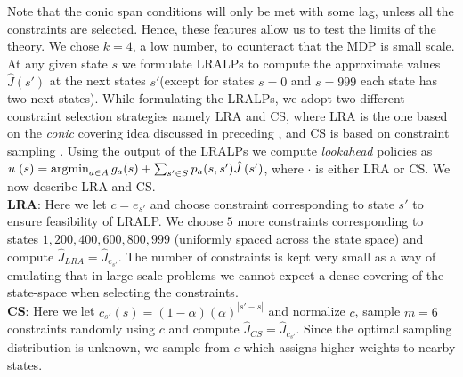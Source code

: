 \documentclass[twocolumn]{IEEEtran}
\begin{document}
Note that the conic span conditions will only be met with some lag, unless all the constraints are selected.
Hence, these features allow us to test the limits of the theory. 
We chose $k=4$, a low number, to counteract  that the MDP is small scale. 
At any given state $s$ we formulate LRALPs to compute the approximate values $\hat{J}(s')$ at the next states $s'$(except for states $s=0$ and $s=999$ each state has two next states). While formulating the LRALPs, we adopt two different constraint selection strategies namely LRA and CS, where  LRA is the one based on the \emph{conic} covering idea discussed in  preceding , and CS is based on constraint sampling \cite{CS}. Using the output of the LRALPs we compute \emph{lookahead} policies as 
$u_{\cdot}(s)=\operatorname{argmin}_{a\in A} g_a(s)+\sum_{s'\in S}p_a(s,s')\hat{J}_{\cdot}(s')$, where $\cdot$ is either LRA or CS.  
We now describe LRA and CS.\\
\textbf{LRA}:  Here we let $c=e_{s'}$ and choose constraint corresponding to state $s'$ to ensure feasibility of LRALP. We choose $5$ more constraints corresponding to states $1,200,400,600,800,999$ (uniformly spaced across the state space) and compute $\hat{J}_{LRA}=\hat{J}_{e_{s'}}$. 
The number of constraints is kept very small as a way of emulating that in large-scale problems we cannot expect a dense covering of the state-space when selecting the constraints.\\
\textbf{CS}: Here we let $c_{s'}(s)=(1-\alpha)(\alpha)^{|s'-s|}$ and normalize $c$, sample $m=6$ constraints randomly using $c$ and compute $\hat{J}_{CS}=\hat{J}_{c_{s'}}$. Since the optimal sampling distribution is unknown, we sample from $c$ which assigns higher weights to nearby states.
\end{document}
